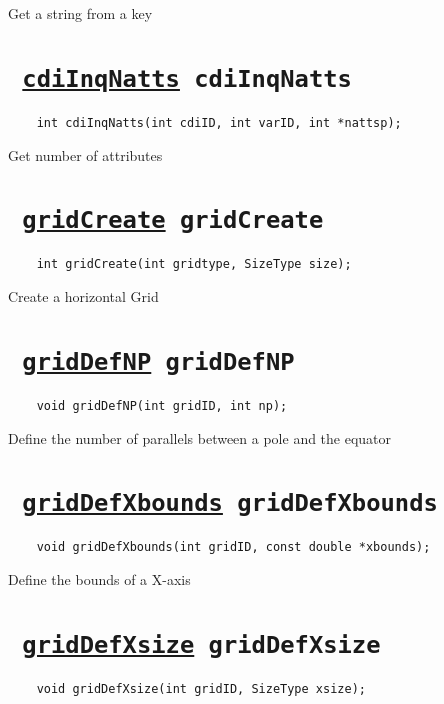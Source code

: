 Get a string from a key
\ifpdfoutput{}{(\ref{cdiInqKeyString})}


\section*{\texttt{ 
\ifpdf
\hyperref[cdiInqNatts]{cdiInqNatts}
\else
cdiInqNatts
\fi
}}
\begin{verbatim}
    int cdiInqNatts(int cdiID, int varID, int *nattsp);
\end{verbatim}

Get number of attributes
\ifpdfoutput{}{(\ref{cdiInqNatts})}


\section*{\texttt{ 
\ifpdf
\hyperref[gridCreate]{gridCreate}
\else
gridCreate
\fi
}}
\begin{verbatim}
    int gridCreate(int gridtype, SizeType size);
\end{verbatim}

Create a horizontal Grid
\ifpdfoutput{}{(\ref{gridCreate})}


\section*{\texttt{ 
\ifpdf
\hyperref[gridDefNP]{gridDefNP}
\else
gridDefNP
\fi
}}
\begin{verbatim}
    void gridDefNP(int gridID, int np);
\end{verbatim}

Define the number of parallels between a pole and the equator
\ifpdfoutput{}{(\ref{gridDefNP})}


\section*{\texttt{ 
\ifpdf
\hyperref[gridDefXbounds]{gridDefXbounds}
\else
gridDefXbounds
\fi
}}
\begin{verbatim}
    void gridDefXbounds(int gridID, const double *xbounds);
\end{verbatim}

Define the bounds of a X-axis
\ifpdfoutput{}{(\ref{gridDefXbounds})}


\section*{\texttt{ 
\ifpdf
\hyperref[gridDefXsize]{gridDefXsize}
\else
gridDefXsize
\fi
}}
\begin{verbatim}
    void gridDefXsize(int gridID, SizeType xsize);
\end{verbatim}

